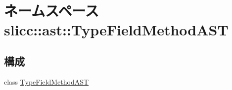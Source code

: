\hypertarget{namespaceslicc_1_1ast_1_1TypeFieldMethodAST}{
\section{ネームスペース slicc::ast::TypeFieldMethodAST}
\label{namespaceslicc_1_1ast_1_1TypeFieldMethodAST}
}
\subsection*{構成}
\begin{DoxyCompactItemize}
\item 
class \hyperlink{classslicc_1_1ast_1_1TypeFieldMethodAST_1_1TypeFieldMethodAST}{TypeFieldMethodAST}
\end{DoxyCompactItemize}
